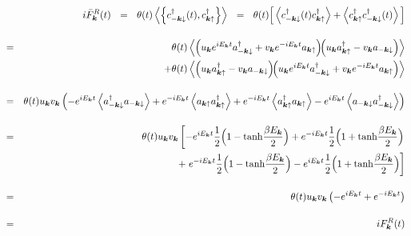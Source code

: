 \documentclass[uplatex,a4j,12pt,dvipdfmx]{jsarticle}
\begin{document}
\begin{eqnarray}
	&&
	i
	\bar{F}_{\bm{k}}^{R}(t)
	\ \ = \ \
	\theta(t)
	\left\langle \left\{
	c_{-\bm{k} \downarrow}^{\dagger}(t), c_{\bm{k} \uparrow}^{\dagger}
	\right\} \right\rangle
	\ \ = \ \
	\theta(t)
	\Big[
		\left\langle
		c_{-\bm{k} \downarrow}^{\dagger}(t) c_{\bm{k} \uparrow}^{\dagger}
		\right\rangle
		+
		\left\langle
		c_{\bm{k} \uparrow}^{\dagger} c_{-\bm{k} \downarrow}^{\dagger}(t)
		\right\rangle
		\Big]
	\nonumber \\[4mm] &=&
	\theta(t)
	\left\langle
	\left(
	u_{\bm{k}} e^{ i E_{\bm{k}} t }
	a_{-\bm{k} \downarrow}^{\dagger}
	+
	v_{\bm{k}} e^{ - i E_{\bm{k}} t }
	a_{\bm{k} \uparrow}
	\right)
	\!\!
	\left(
	u_{\bm{k}} a_{\bm{k} \uparrow}^{\dagger}
	-
	v_{\bm{k}} a_{-\bm{k} \downarrow}
	\right)
	\right\rangle
	\nonumber \\ && \hspace{5mm} +
	\theta(t)
	\left\langle
	\left(
	u_{\bm{k}} a_{\bm{k} \uparrow}^{\dagger}
	-
	v_{\bm{k}} a_{-\bm{k} \downarrow}
	\right)
	\!\!
	\left(
	u_{\bm{k}} e^{ i E_{\bm{k}} t }
	a_{-\bm{k} \downarrow}^{\dagger}
	+
	v_{\bm{k}} e^{ - i E_{\bm{k}} t }
	a_{\bm{k} \uparrow}
	\right)
	\right\rangle
	\nonumber \\[4mm]
	&=&
	\theta(t)
	u_{\bm{k}}
	v_{\bm{k}}
	\left(
	-
	e^{ i E_{\bm{k}} t }
	\left\langle
	a_{-\bm{k} \downarrow}^{\dagger}
	a_{-\bm{k} \downarrow}
	\right\rangle
	+
	e^{ - i E_{\bm{k}} t }
	\left\langle
	a_{\bm{k} \uparrow}
	a_{\bm{k} \uparrow}^{\dagger}
	\right\rangle
	+
	e^{ - i E_{\bm{k}} t }
	\left\langle
	a_{\bm{k} \uparrow}^{\dagger}
	a_{\bm{k} \uparrow}
	\right\rangle
	-
	e^{ i E_{\bm{k}} t }
	\left\langle
	a_{-\bm{k} \downarrow}
	a_{-\bm{k} \downarrow}^{\dagger}
	\right\rangle
	\right)
	\nonumber \\[4mm]
	&=&
	\theta(t)
	u_{\bm{k}}
	v_{\bm{k}}
	\left[
		-
		e^{ i E_{\bm{k}} t }
		\dfrac{1}{2}
		\Big( 1 - {\rm tanh}\dfrac{\beta E_{\bm{k}}}{2} \Big)
		+
		e^{ - i E_{\bm{k}} t }
		\dfrac{1}{2}
		\Big( 1 + {\rm tanh}\dfrac{\beta E_{\bm{k}}}{2} \Big)
		\right.
		\nonumber \\ && \hspace{5mm} +
		\left.
		e^{ - i E_{\bm{k}} t }
		\dfrac{1}{2}
		\Big( 1 - {\rm tanh}\dfrac{\beta E_{\bm{k}}}{2} \Big)
		-
		e^{ i E_{\bm{k}} t }
		\dfrac{1}{2}
		\Big( 1 + {\rm tanh}\dfrac{\beta E_{\bm{k}}}{2} \Big)
		\right]
	\nonumber \\[4mm] &=&
	\theta(t)
	u_{\bm{k}}
	v_{\bm{k}}
	\left(
	-
	e^{ i E_{\bm{k}} t }
	+
	e^{ - i E_{\bm{k}} t }
	\right)
	\nonumber \\[4mm] &=&
	i
	F_{\bm{k}}^{R}(t)
\end{eqnarray}
\end{document}
